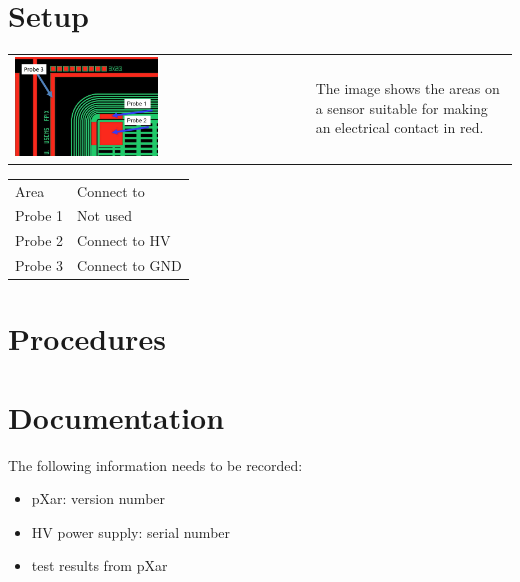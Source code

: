 \documentclass[10pt]{unlsilabsop}
\begin{document}
\section{Setup}

\begin{tabular}{p{}p{}}
\includegraphics[width=0.5\textwidth]{img/SensorProbePositions.png} &
The image shows the areas on a sensor suitable for making an electrical contact in red.
\end{tabular}

\begin{tabular}{ll}
Area & Connect to \\
Probe 1 & Not used \\
Probe 2 & Connect to HV \\
Probe 3 & Connect to GND \\
\end{tabular}

\section{Procedures}

\section{Documentation}
The following information needs to be recorded:
\begin{itemize}
\item pXar: version number
\item HV power supply: serial number
\item test results from pXar
\end{itemize}
\end{document}
